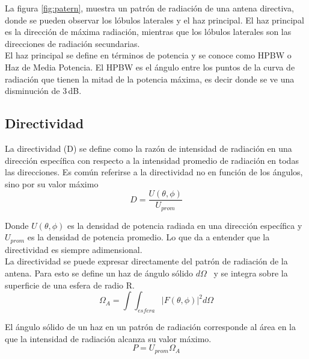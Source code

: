 La figura \ref{fig:patern}, muestra un patrón de radiación de una antena directiva, donde se pueden observar los lóbulos laterales y el haz principal. El haz principal es la dirección de máxima radiación, mientras que los lóbulos laterales son las direcciones de radiación secundarias.\\

El haz principal se define en términos de potencia y se conoce como HPBW o Haz de Media Potencia. El HPBW es el ángulo entre los puntos de la curva de radiación que tienen la mitad de la potencia máxima, es decir donde se ve una disminución de 3 dB.\\

\subsection{Directividad}

La directividad (D) se define como la razón de intensidad de radiación en una dirección específica con respecto a la intensidad promedio de radiación en todas las direcciones. Es común referirse a la directividad no en función de los ángulos, sino por su valor máximo\\

\begin{equation}\label{eq:directivity}
    D = \frac{U(\theta, \phi)}{U_{prom}}
\end{equation}

Donde $U(\theta, \phi)$ es la densidad de potencia radiada en una dirección específica y $U_{prom}$ es la densidad de potencia promedio. Lo que da a entender que la directividad es siempre adimensional.\\

La directividad se puede expresar directamente del patrón de radiación de la antena. Para esto se define un haz de ángulo sólido $d\Omega$  y se integra sobre la superficie de una esfera de radio R.\\

\begin{equation}\label{eq:solidangle}
    \Omega_{A} = \int\int_{esfera} |F(\theta, \phi)|^{2} d\Omega
\end{equation}

El ángulo sólido de un haz en un patrón de radiación corresponde al área en la que la intensidad de radiación alcanza su valor máximo.\\

\begin{equation}\label{eq:powerdensity}
    P = U_{prom} \Omega_{A}
\end{equation}

